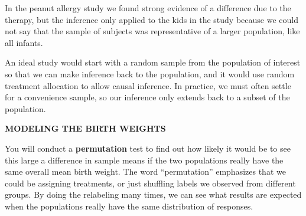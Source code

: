 In the  peanut allergy study we found strong evidence of a
difference due to the therapy, but the inference only applied to the
kids in the study because we could not say that the sample of
subjects was representative of a larger population, like all infants.

An ideal study would start with a random sample from the population of
interest so that we can make inference back to the population, and it
would use random treatment allocation to allow causal inference. In
practice, we must often settle for a convenience sample, so our
inference only extends back to a subset of the population.   


{\bf MODELING THE BIRTH WEIGHTS}

You will conduct a {\bf permutation} test to find out how likely it would
be to see this large a difference in sample means if the two
populations really have the same overall mean birth weight. The word
``permutation''  emphasizes that we could be assigning treatments, or just
shuffling labels we observed from different groups.  By doing the
relabeling many times, we can see what results are expected when the
populations really have the same distribution of responses. 

